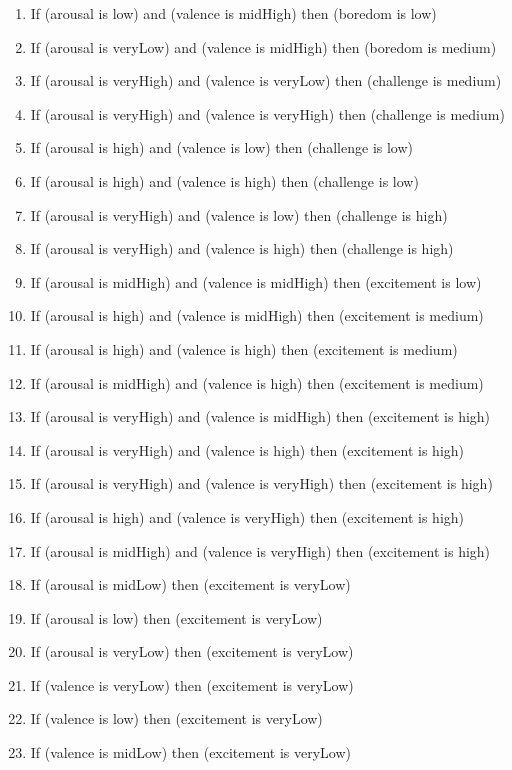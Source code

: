 \begin{enumerate}
\item If (arousal is low) and (valence is midHigh) then (boredom is low)
\item If (arousal is veryLow) and (valence is midHigh) then (boredom is medium)
\item If (arousal is veryHigh) and (valence is veryLow) then (challenge is medium)
\item If (arousal is veryHigh) and (valence is veryHigh) then (challenge is medium)
\item If (arousal is high) and (valence is low) then (challenge is low)
\item If (arousal is high) and (valence is high) then (challenge is low)
\item If (arousal is veryHigh) and (valence is low) then (challenge is high)
\item If (arousal is veryHigh) and (valence is high) then (challenge is high)
\item If (arousal is midHigh) and (valence is midHigh) then (excitement is low)
\item If (arousal is high) and (valence is midHigh) then (excitement is medium)
\item If (arousal is high) and (valence is high) then (excitement is medium)
\item If (arousal is midHigh) and (valence is high) then (excitement is medium)
\item If (arousal is veryHigh) and (valence is midHigh) then (excitement is high)
\item If (arousal is veryHigh) and (valence is high) then (excitement is high)
\item If (arousal is veryHigh) and (valence is veryHigh) then (excitement is high)
\item If (arousal is high) and (valence is veryHigh) then (excitement is high)
\item If (arousal is midHigh) and (valence is veryHigh) then (excitement is high)
\item If (arousal is midLow) then (excitement is veryLow)
\item If (arousal is low) then (excitement is veryLow)
\item If (arousal is veryLow) then (excitement is veryLow)
\item If (valence is veryLow) then (excitement is veryLow)
\item If (valence is low) then (excitement is veryLow)
\item If (valence is midLow) then (excitement is veryLow)
\end{enumerate}
